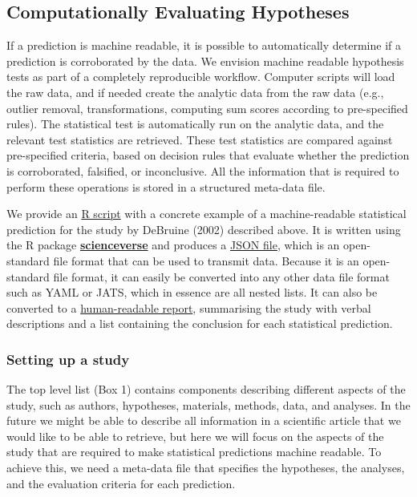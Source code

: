 \documentclass[english,doc,floatsintext]{apa6}
\begin{document}
\hypertarget{computationally-evaluating-hypotheses}{%
\subsection{Computationally Evaluating Hypotheses}\label{computationally-evaluating-hypotheses}}

If a prediction is machine readable, it is possible to automatically determine if a prediction is corroborated by the data. We envision machine readable hypothesis tests as part of a completely reproducible workflow. Computer scripts will load the raw data, and if needed create the analytic data from the raw data (e.g., outlier removal, transformations, computing sum scores according to pre-specified rules). The statistical test is automatically run on the analytic data, and the relevant test statistics are retrieved. These test statistics are compared against pre-specified criteria, based on decision rules that evaluate whether the prediction is corroborated, falsified, or inconclusive. All the information that is required to perform these operations is stored in a structured meta-data file.

We provide an \href{example/example.Rmd}{R script} with a concrete example of a machine-readable statistical prediction for the study by DeBruine (2002) described above. It is written using the R package \href{https://scienceverse.github.io/scienceverse/}{\textbf{scienceverse}} and produces a \href{example/postreg.json}{JSON file}, which is an open-standard file format that can be used to transmit data. Because it is an open-standard file format, it can easily be converted into any other data file format such as YAML or JATS, which in essence are all nested lists. It can also be converted to a \href{example/postreg.html}{human-readable report}, summarising the study with verbal descriptions and a list containing the conclusion for each statistical prediction.

\hypertarget{setting-up-a-study}{%
\subsubsection{Setting up a study}\label{setting-up-a-study}}

The top level list (Box 1) contains components describing different aspects of the study, such as authors, hypotheses, materials, methods, data, and analyses. In the future we might be able to describe all information in a scientific article that we would like to be able to retrieve, but here we will focus on the aspects of the study that are required to make statistical predictions machine readable. To achieve this, we need a meta-data file that specifies the hypotheses, the analyses, and the evaluation criteria for each prediction.
\end{document}
